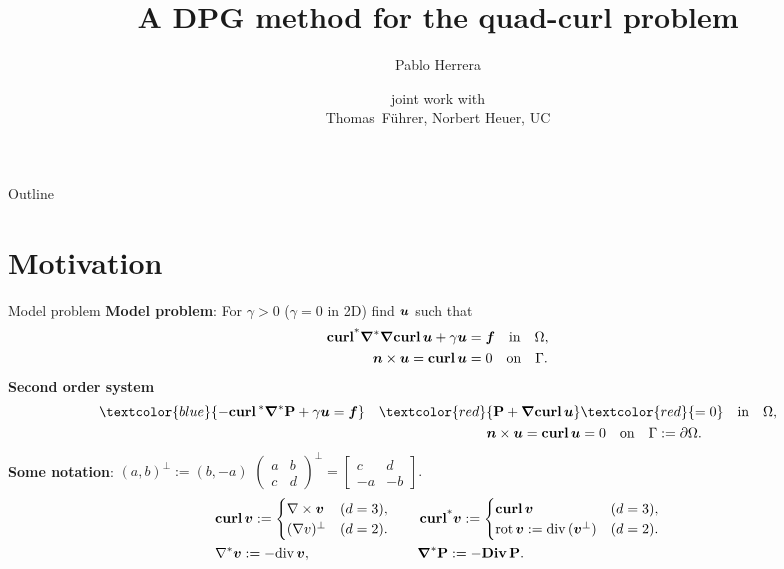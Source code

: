 \documentclass[10pt, compress]{beamer}
\title[Short Title]{A DPG method for the quad-curl problem}
\author{Pablo Herrera}
\institute{P. Universidad Cat\'olica de Chile, Santiago, Chile}
\date{{\footnotesize joint work with}\\[1em]
      {\small Thomas~F\"uhrer, Norbert Heuer, UC}
     }
\begin{document}
\begin{frame}
\titlepage
\end{frame}
\begin{frame}{Outline}
    \tableofcontents
\end{frame}
\section{Motivation}
\begin{frame}{Model problem}    
    \textbf{Model problem}: For $\gamma >0 $ ($\gamma=0$ in 2D)   find $\boldsymbol{u}$ such that
    \begin{align*} 
        \operatorname{\mathbf{curl^*\!}}\boldsymbol{\nabla}^{*} \boldsymbol{\nabla} {\bf curl\,} \boldsymbol{u} +\gamma \boldsymbol{u} &= \boldsymbol{f}  \quad \text{in} \quad \Omega, \\
        \boldsymbol{n} \times \boldsymbol{u} = {\bf curl\,} \boldsymbol{u}  &= 0 \quad \text{on} \quad \Gamma. \\
    \end{align*}
    \textbf{Second order system} 
    \begin{align*}
        \textcolor{blue}{-\Curl^{*}\Grad^{*} \PP + \gamma \bu = \ff }\quad \textcolor{red}{\PP+\Grad\Curl \bu } &\textcolor{red}{= 0} \quad \text{in} \quad \Omega, \\
        \nn \times \bu = \Curl \bu  &= 0 \quad \text{on} \quad \Gamma:=\partial \Omega.
    \end{align*}
\textbf{Some notation}: $(a,b)^\perp := (b,-a)$  \hspace{2em} $\begin{pmatrix}
    a & b \\
    c & d
\end{pmatrix}^\perp = \begin{bmatrix}
    c & d \\
    -a & -b
\end{bmatrix}.
$
\begin{align*}
       &{\bf curl\,}\boldsymbol{v}:= \begin{cases} \nabla\times\boldsymbol{v} & (d=3),\\ (\nabla v)^\perp & (d=2).\end{cases} \quad
       &&\operatorname{\mathbf{curl^*\!}}\boldsymbol{v} := \begin{cases} {\bf curl\,}\boldsymbol{v} & (d=3),\\ {\rm rot\,}\boldsymbol{v}:={\rm div\,}(\boldsymbol{v}^\perp) & (d=2).\end{cases} \\
       &\nabla^{*} \boldsymbol{v} := -{\rm div\,} \boldsymbol{v}, \quad &&\boldsymbol{\nabla}^{*} \mathbf{P} := -{\rm\bf Div\,} \mathbf{P}.
\end{align*}
\end{frame}
\end{document}
